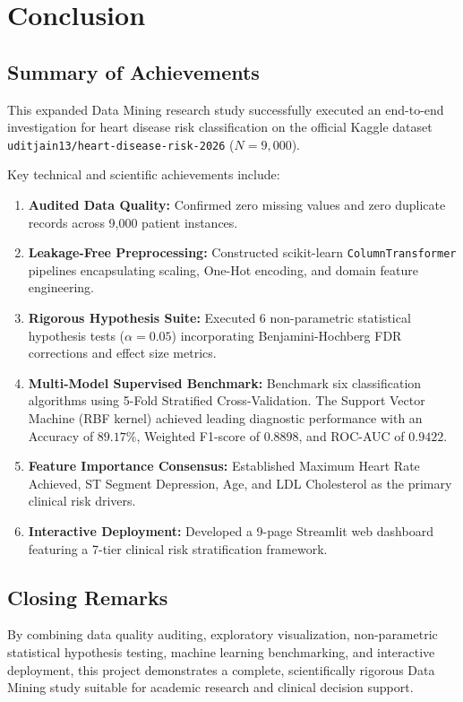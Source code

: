 \chapter{Conclusion}

\section{Summary of Achievements}
This expanded Data Mining research study successfully executed an end-to-end investigation for heart disease risk classification on the official Kaggle dataset \texttt{uditjain13/heart-disease-risk-2026} ($N=9,000$). 

Key technical and scientific achievements include:
\begin{enumerate}
    \item \textbf{Audited Data Quality:} Confirmed zero missing values and zero duplicate records across 9,000 patient instances.
    \item \textbf{Leakage-Free Preprocessing:} Constructed scikit-learn \texttt{ColumnTransformer} pipelines encapsulating scaling, One-Hot encoding, and domain feature engineering.
    \item \textbf{Rigorous Hypothesis Suite:} Executed 6 non-parametric statistical hypothesis tests ($\alpha = 0.05$) incorporating Benjamini-Hochberg FDR corrections and effect size metrics.
    \item \textbf{Multi-Model Supervised Benchmark:} Benchmark six classification algorithms using 5-Fold Stratified Cross-Validation. The Support Vector Machine (RBF kernel) achieved leading diagnostic performance with an Accuracy of $89.17\%$, Weighted F1-score of $0.8898$, and ROC-AUC of $0.9422$.
    \item \textbf{Feature Importance Consensus:} Established Maximum Heart Rate Achieved, ST Segment Depression, Age, and LDL Cholesterol as the primary clinical risk drivers.
    \item \textbf{Interactive Deployment:} Developed a 9-page Streamlit web dashboard featuring a 7-tier clinical risk stratification framework.
\end{enumerate}

\section{Closing Remarks}
By combining data quality auditing, exploratory visualization, non-parametric statistical hypothesis testing, machine learning benchmarking, and interactive deployment, this project demonstrates a complete, scientifically rigorous Data Mining study suitable for academic research and clinical decision support.
